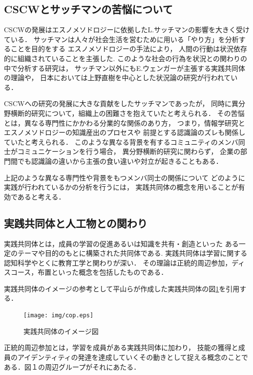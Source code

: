 \documentclass[submit,techrep]{ipsj}
\begin{document}
\subsection{CSCWとサッチマンの苦悩について}
CSCWの発展はエスノメソドロジーに依拠したL.サッチマンの影響を大きく受けている．
サッチマンは人々が社会生活を営むために用いる「やり方」を分析することを目的をする
エスノメソドロジー\cite{ethnomethodology}の手法により，
人間の行動は状況依存的に組織されていることを主張した\cite{suchman}.
このような社会の行為を状況との関わりの中で分析する研究は，
サッチマン以外にもE.ウェンガーが主張する実践共同体\cite{wenger}の理論や，
日本においては上野直樹を中心とした状況論の研究が行われている\cite{ueno}．

CSCWへの研究の発展に大きな貢献をしたサッチマンであったが，
同時に異分野横断的研究について，組織上の困難さを抱えていたと考えられる\cite{SuchmanDistress}．
その苦悩とは，異なる専門性にかかわる分業的な関係のあり方，
つまり，情報学研究とエスノメソドロジーの知識産出のプロセスや
前提とする認識論のズレも関係していたと考えられる\cite{gap}．
このような異なる背景を有するコミュニティのメンバ同士がコミュニケーションを行う場合，
異分野横断的研究に関わらず，
企業の部門間でも認識論の違いから主張の食い違いや対立が起きることもある\cite{conflict}．

上記のような異なる専門性や背景をもつメンバ同士の関係について
どのように実践が行われているかの分析を行うには，
実践共同体の概念を用いることが有効であると考える．

\subsection{実践共同体と人工物との関わり}


実践共同体とは，成員の学習の促進あるいは知識を共有・創造といった
ある一定のテーマや目的のもとに構築された共同体である.
実践共同体は学習に関する認知科学やとくに教育工学と関わりが深い．
その理論は正統的周辺参加，ディスコース，布置といった概念を包括したものである．

実践共同体のイメージの参考として平山\cite{copImg}らが作成した実践共同体の図\ref{cop}を引用する．
\begin{figure}[h]
  \centering
  \texttt{[image: img/cop.eps]}
  \caption{実践共同体のイメージ図}
  \label{cop}
\end{figure}
正統的周辺参加とは，学習を成員がある実践共同体に加わり，
技能の獲得と成員のアイデンティティの発達を達成していくその動きとして捉える概念のことである．図１の周辺グループがそれにあたる．
\end{document}

